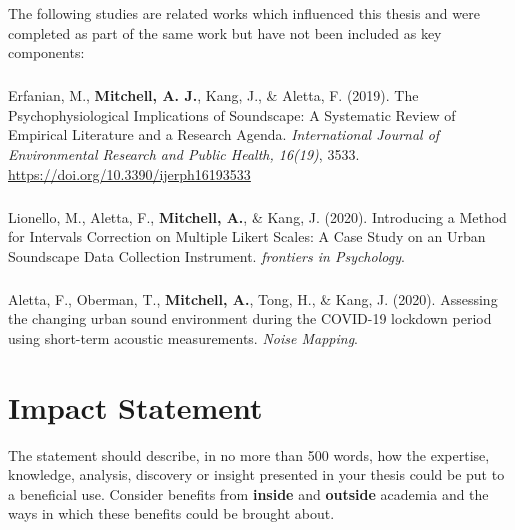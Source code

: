 \documentclass[twoside,fontsize=12pt,titlepage]{scrbook}
\begin{document}

\newpage
The following studies are related works which influenced this thesis and were completed as part of the same work but have not been included as key components:

\paragraph*{}Erfanian, M., \textbf{Mitchell, A. J.}, Kang, J., \& Aletta, F. (2019). The Psychophysiological Implications of Soundscape: A Systematic Review of Empirical Literature and a Research Agenda. \emph{International Journal of Environmental Research and Public Health, 16(19)}, 3533. \url{https://doi.org/10.3390/ijerph16193533}

\paragraph*{}Lionello, M., Aletta, F., \textbf{Mitchell, A.}, \& Kang, J. (2020). Introducing a Method for Intervals Correction on Multiple Likert Scales: A Case Study on an Urban Soundscape Data Collection Instrument. \emph{frontiers in Psychology}.

\paragraph*{}Aletta, F., Oberman, T., \textbf{Mitchell, A.}, Tong, H., \& Kang, J. (2020). Assessing the changing urban sound environment during the COVID-19 lockdown period using short-term acoustic measurements. \emph{Noise Mapping}.




\chapter*{Impact Statement}
The statement should describe, in no more than 500 words, how the expertise, knowledge, analysis, discovery or insight presented in your thesis could be put to a beneficial use. Consider benefits from \textbf{inside} and \textbf{outside} academia and the ways in which these benefits could be brought about.
\end{document}
